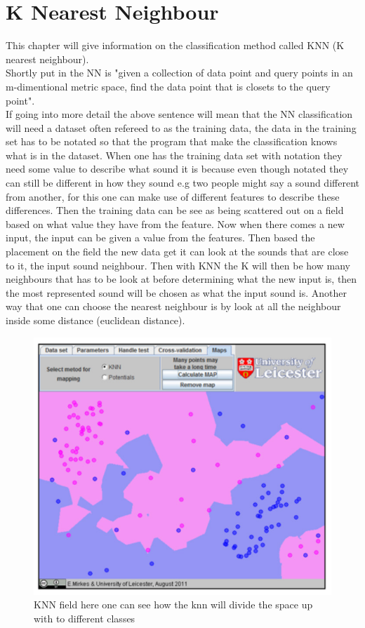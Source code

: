 \section{K Nearest Neighbour}
This chapter will give information on the classification method called KNN (K nearest neighbour).\\
Shortly put in \citep{meaningfulNN} the NN is "given a collection of data point and query points in an m-dimentional metric space, find the data point that is closets to the query point".\\
If going into more detail the above sentence will mean that the NN classification will need a dataset often refereed to as the training data, the data in the training set has to be notated so that the program that make the classification knows what is in the dataset. When one has the training data set with notation they need some value to describe what sound it is  because even though notated they can still be different in how they sound e.g two people might say a sound different from another, for this one can make use of different features to describe these differences. Then the training data can be see as being scattered out on a field based on what value they have from the feature. Now when there comes a new input, the input can be given a value from the features. Then based the placement on the field the new data get it can look at the sounds that are close to it, the input sound neighbour. Then with KNN the K will then be how many neighbours that has to be look at before determining what the new input is, then the most represented sound will be chosen as what the input sound is. Another way that one can choose the nearest neighbour is by look at all the neighbour inside some distance (euclidean distance)\citep{NNHD}.

\begin{figure}[h]
	\begin{center}
		\includegraphics[scale = 0.5]{fig/KNNfig.jpg}
		\caption{KNN field here one can see how the knn will divide the space up with to different classes \citep{introKNN}}
		\label{KNN fig}
	\end{center}
\end{figure}
